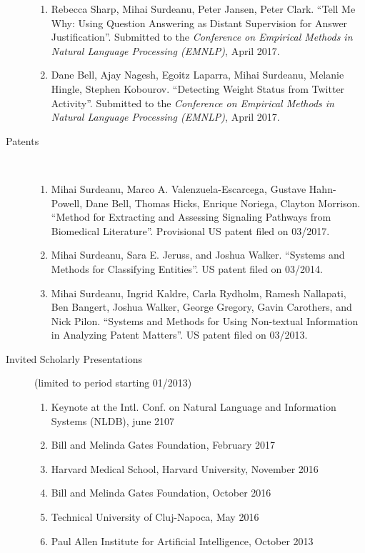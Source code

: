 \documentclass[10pt]{article}
\newcommand{\ve}[1]{{\em #1}} %
\newcommand{\ti}[1]{``#1''} %
\newcommand{\lmt}{(limited to period starting 01/2013)}
\begin{document}
\begin{description}
\begin{enumerate}
\item
Rebecca Sharp, Mihai Surdeanu, Peter Jansen, Peter Clark.  \ti{Tell Me Why: Using Question Answering as Distant Supervision for Answer Justification}. Submitted to the \ve{Conference on Empirical Methods in Natural Language Processing (EMNLP)}, April 2017.

\item 
Dane Bell, Ajay Nagesh, Egoitz Laparra, Mihai Surdeanu, Melanie Hingle, Stephen Kobourov. \ti{Detecting Weight Status from Twitter Activity}. Submitted to the \ve{Conference on Empirical Methods in Natural Language Processing (EMNLP)}, April 2017.


\end{enumerate}


\item [Patents] \
\begin{enumerate}

\item 
Mihai Surdeanu, Marco A. Valenzuela-Escarcega, Gustave Hahn-Powell, Dane Bell, Thomas Hicks, Enrique Noriega, Clayton Morrison. \ti{Method for Extracting and Assessing Signaling Pathways from Biomedical Literature}. Provisional US patent filed on 03/2017.

\item 
Mihai Surdeanu, Sara E. Jeruss, and Joshua Walker. \ti{Systems and Methods for Classifying Entities}. US patent filed on 03/2014. 

\item 
Mihai Surdeanu, Ingrid Kaldre, Carla Rydholm, Ramesh Nallapati, Ben Bangert, Joshua Walker, George Gregory, Gavin Carothers, and Nick Pilon. \ti{Systems and Methods for Using Non-textual Information in Analyzing Patent Matters}. US patent filed on 03/2013.

\end{enumerate}


\item [Invited Scholarly Presentations] \lmt \
\begin{enumerate}

\item Keynote at the Intl. Conf. on Natural Language and Information Systems (NLDB), june 2107
\item Bill and Melinda Gates Foundation, February 2017
\item Harvard Medical School, Harvard University, November 2016
\item Bill and Melinda Gates Foundation, October 2016
\item Technical University of Cluj-Napoca, May 2016
\item Paul Allen Institute for Artificial Intelligence, October 2013
\end{enumerate}


\end{description}
\end{document}
